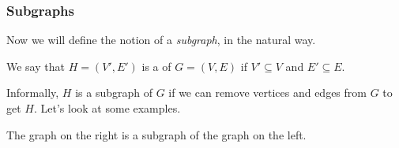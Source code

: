 \documentclass[11pt, mathserif]{beamer}
\theoremstyle{definition}
\theoremstyle{remark}
\begin{document}
\begin{frame}
  \frametitle{Subgraphs}


Now we will define the notion of a \emph{subgraph}, in the natural way.

\begin{definition}[Subgraph]
	We say that $H= (V', E')$ is a  of $G = (V, E)$ if $V' \subseteq V$ and $E' \subseteq E$.
\end{definition}

Informally, $H$ is a subgraph of $G$ if we can remove vertices and edges from $G$ to get $H$. Let's look at some examples.


\pause

\vspace{2\baselineskip}

\begin{example}
	The graph on the right is a subgraph of the graph on the left.
\begin{center}
	


\begin{tikzpicture}[x=0.75pt,y=0.75pt,yscale=-1,xscale=1]


\end{tikzpicture}
\end{center}
\end{example}
\end{frame}
\end{document}
